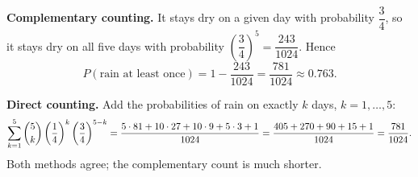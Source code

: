\textbf{Complementary counting.} It stays dry on a given day with probability $\dfrac{3}{4}$, so it stays dry on all five days with probability $\left(\dfrac{3}{4}\right)^5=\dfrac{243}{1024}$. Hence
\[
P(\text{rain at least once})=1-\dfrac{243}{1024}=\boxed{\dfrac{781}{1024}}\approx0.763 .
\]

\textbf{Direct counting.} Add the probabilities of rain on exactly $k$ days, $k=1,\dots,5$:
\[
\sum_{k=1}^{5}\dbinom5k\left(\dfrac{1}{4}\right)^k\left(\dfrac{3}{4}\right)^{5-k}=\dfrac{5\cdot81+10\cdot27+10\cdot9+5\cdot3+1}{1024}=\dfrac{405+270+90+15+1}{1024}=\dfrac{781}{1024}.
\]
Both methods agree; the complementary count is much shorter.
